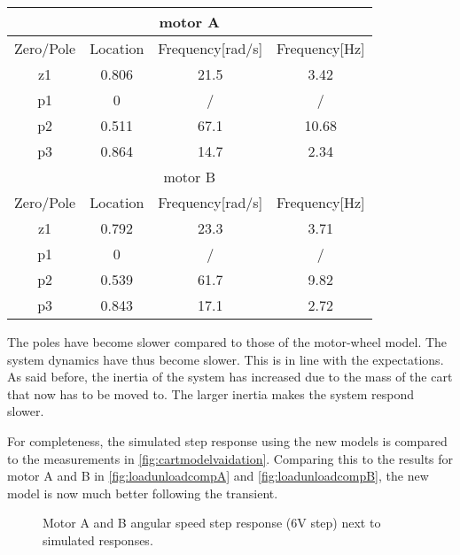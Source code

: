 \documentclass[a4paper]{article}
\newcommand{\newpar}{\vspace{.3cm}\noindent}
\begin{document}
\begin{center}
    \begin{tabular}{ |c|c|c|c|}
    \hline
    \multicolumn{4}{|c|}{motor A} \\
    \hline
    Zero/Pole & Location & Frequency{[}rad/s{]} & Frequency{[}Hz{]}  \\
    \hline
    z1        & 0.806    & 21.5                &  3.42           \\
    \hline
    p1        & 0         & /                   & /                 \\
    \hline
    p2        & 0.511   & 67.1                 & 10.68            \\
    \hline
    p3        & 0.864     & 14.7                  & 2.34 \\ 
    \hline
    \hline
    \multicolumn{4}{|c|}{motor B} \\
    \hline
    Zero/Pole & Location & Frequency{[}rad/s{]} & Frequency{[}Hz{]}  \\
    \hline
    z1        & 0.792    & 23.3                &    3.71         \\
    \hline
    p1        & 0         & /                   & /                 \\
    \hline
    p2        & 0.539   & 61.7                 &   9.82          \\
    \hline
    p3        & 0.843     & 17.1                  & 2.72           \\ 
    \hline
    \end{tabular}  
    \label{tab:location_Sys_31z_f}
\end{center}

\newpar 
The poles have become slower compared to those of the motor-wheel model. The system dynamics have thus become slower. This is in line with the expectations. As said before, the inertia of the system has increased due to the mass of the cart that now has to be moved to. The larger inertia makes the system respond slower.

For completeness, the simulated step response using the new models is compared to the measurements in \autoref{fig:cartmodelvaidation}. Comparing this to the results for motor A and B in \autoref{fig:loadunloadcompA} and \autoref{fig:loadunloadcompB}, the new model is now much better following the transient.

\begin{figure}[H]
    \caption{Motor A and B angular speed step response (6V step) next to simulated responses.}
    \label{fig:cartmodelvalidation}
\end{figure}
\end{document}
